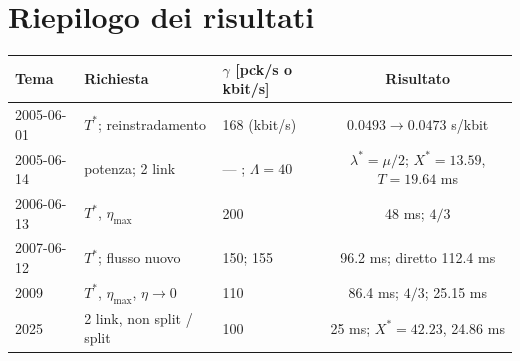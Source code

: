 \section{Riepilogo dei risultati}
\begin{center}\small
\begin{tabular}{lllc}
\toprule
Tema & Richiesta & $\gamma$ [pck/s o kbit/s] & Risultato\\
\midrule
2005-06-01 & $T^*$; reinstradamento & 168 (kbit/s) & $0.0493\to0.0473$ s/kbit\\
2005-06-14 & potenza; 2 link & --- ; $\Lambda=40$ & $\lambda^*=\mu/2$; $X^*=13.59$, $T=19.64$ ms\\
2006-06-13 & $T^*$, $\eta_{\max}$ & 200 & 48 ms; $4/3$\\
2007-06-12 & $T^*$; flusso nuovo & 150; 155 & 96.2 ms; diretto 112.4 ms\\
2009 & $T^*$, $\eta_{\max}$, $\eta\to0$ & 110 & 86.4 ms; $4/3$; 25.15 ms\\
2025 & 2 link, non split / split & 100 & 25 ms; $X^*=42.23$, 24.86 ms\\
\bottomrule
\end{tabular}
\end{center}

